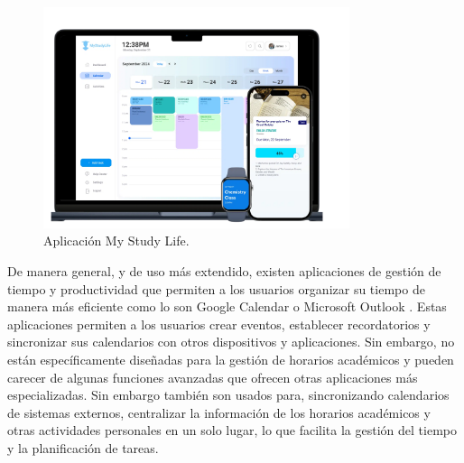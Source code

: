 \begin{itemize}
      \begin{figure}[H]
            \centering
            \includegraphics[width=0.8\textwidth]{figures/03_my_study_life.png}
            \caption{Aplicación My Study Life.}
            \label{fig:mystudylife}
      \end{figure}

      De manera general, y de uso más extendido, existen aplicaciones de gestión de tiempo y productividad que permiten a los usuarios organizar su tiempo de manera más eficiente como lo son Google Calendar \cite{webGoogleCalendar} o Microsoft Outlook \cite{webOutlook}.
      Estas aplicaciones permiten a los usuarios crear eventos, establecer recordatorios y sincronizar sus calendarios con otros dispositivos y aplicaciones. Sin embargo, no están específicamente diseñadas para la gestión de horarios académicos y pueden carecer de algunas funciones avanzadas que ofrecen otras aplicaciones más especializadas.
      Sin embargo también son usados para, sincronizando calendarios de sistemas externos, centralizar la información de los horarios académicos y otras actividades personales en un solo lugar, lo que facilita la gestión del tiempo y la planificación de tareas.


\end{itemize}
